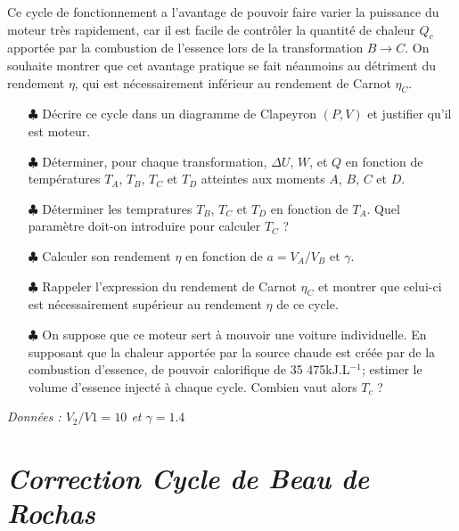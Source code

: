 \documentclass{report}
\begin{document}
Ce cycle de fonctionnement a l'avantage de pouvoir faire varier la puissance du moteur très rapidement, car il est facile de contrôler la quantité de chaleur $Q_c$ apportée par la combustion de l'essence lors de la transformation $B \rightarrow C$. On souhaite montrer que cet avantage pratique se fait néanmoins au détriment du rendement $\eta$, qui est nécessairement inférieur au rendement de Carnot $\eta_C$.

\begin{itemize}

	\item[$\clubsuit$] Décrire ce cycle dans un diagramme de Clapeyron $(P,V)$ et justifier qu'il est moteur.

	\item[$\clubsuit$] Déterminer, pour chaque transformation, $\Delta U$, $W$, et $Q$ en fonction de températures $T_A$, $T_B$, $T_C$ et $T_D$ atteintes aux moments $A$, $B$, $C$ et $D$.
	
	\item[$\clubsuit$] Déterminer les tempratures $T_B$, $T_C$ et $T_D$ en fonction de $T_A$. Quel paramètre doit-on introduire pour calculer $T_C$ ? 
	
	\item[$\clubsuit$]  Calculer son rendement $\eta$ en fonction de $a=V_A/V_B$ et $\gamma$. 
	
	\item[$\clubsuit$] Rappeler l'expression du rendement de Carnot $\eta_C$ et montrer que celui-ci est nécessairement supérieur au rendement $\eta$ de ce cycle.
	
	\item[$\clubsuit$] On suppose que ce moteur sert à mouvoir une voiture individuelle. En supposant que la chaleur apportée par la source chaude est créée par de la combustion d'essence, de pouvoir calorifique de 35 475kJ.L$^{-1}$; estimer le volume d'essence injecté à chaque cycle. Combien vaut alors $T_c$ ?
	
\end{itemize}

\textit{Données : $ V_{2}/V{1} = 10$ et $ \gamma=1.4$}

\newpage

\section*{\textit{Correction Cycle de Beau de Rochas}}
\end{document}
